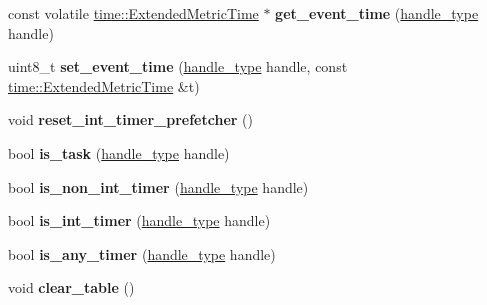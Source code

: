 \begin{DoxyCompactItemize}
\item 
\mbox{\label{classfsl_1_1os_1_1scheduler_a7428b8819784d347c92847463937456d}} 
const volatile \mbox{\hyperlink{classtime_1_1_extended_metric_time}{time\+::\+Extended\+Metric\+Time}} $\ast$ {\bfseries get\+\_\+event\+\_\+time} (\mbox{\hyperlink{classfsl_1_1lg_1_1range__int}{handle\+\_\+type}} handle)
\item 
\mbox{\label{classfsl_1_1os_1_1scheduler_a3e9b155d4d62b1c4a7011293358c9ca7}} 
uint8\+\_\+t {\bfseries set\+\_\+event\+\_\+time} (\mbox{\hyperlink{classfsl_1_1lg_1_1range__int}{handle\+\_\+type}} handle, const \mbox{\hyperlink{classtime_1_1_extended_metric_time}{time\+::\+Extended\+Metric\+Time}} \&t)
\item 
\mbox{\label{classfsl_1_1os_1_1scheduler_a17025ec64682c111464d0e8bc7cc850a}} 
void {\bfseries reset\+\_\+int\+\_\+timer\+\_\+prefetcher} ()
\item 
\mbox{\label{classfsl_1_1os_1_1scheduler_a7d881f6c339e0da9feb668747d606e73}} 
bool {\bfseries is\+\_\+task} (\mbox{\hyperlink{classfsl_1_1lg_1_1range__int}{handle\+\_\+type}} handle)
\item 
\mbox{\label{classfsl_1_1os_1_1scheduler_a9f4c0a4eb6caf35139af05e818c13310}} 
bool {\bfseries is\+\_\+non\+\_\+int\+\_\+timer} (\mbox{\hyperlink{classfsl_1_1lg_1_1range__int}{handle\+\_\+type}} handle)
\item 
\mbox{\label{classfsl_1_1os_1_1scheduler_a4d18213ae23aded6dad07c955e08527e}} 
bool {\bfseries is\+\_\+int\+\_\+timer} (\mbox{\hyperlink{classfsl_1_1lg_1_1range__int}{handle\+\_\+type}} handle)
\item 
\mbox{\label{classfsl_1_1os_1_1scheduler_a4046734e427d3a8da7e50008447f79f4}} 
bool {\bfseries is\+\_\+any\+\_\+timer} (\mbox{\hyperlink{classfsl_1_1lg_1_1range__int}{handle\+\_\+type}} handle)
\item 
\mbox{\label{classfsl_1_1os_1_1scheduler_ac63e2cc300b9eeaefe9232dc0fad58c1}} 
void {\bfseries clear\+\_\+table} ()

\end{DoxyCompactItemize}
